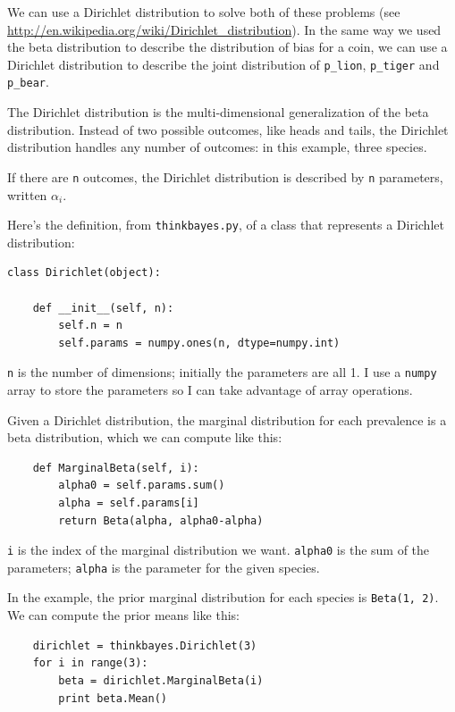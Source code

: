 \documentclass[12pt]{book}
\begin{document}
We can use a Dirichlet distribution to solve both of these problems
(see \url{http://en.wikipedia.org/wiki/Dirichlet_distribution}).  In
the same way we used the beta distribution to describe the
distribution of bias for a coin, we can use a Dirichlet
distribution to describe the joint distribution of \verb"p_lion",
\verb"p_tiger" and \verb"p_bear".

The Dirichlet distribution is the multi-dimensional generalization
of the beta distribution.  Instead of two possible outcomes, like
heads and tails, the Dirichlet distribution handles any number of
outcomes: in this example, three species.

If there are {\tt n} outcomes, the Dirichlet distribution is
described by {\tt n} parameters, written $\alpha_i$.

Here's the definition, from {\tt thinkbayes.py}, of a class that
represents a Dirichlet distribution:

\begin{verbatim}
class Dirichlet(object):

    def __init__(self, n):
        self.n = n
        self.params = numpy.ones(n, dtype=numpy.int)
\end{verbatim}

{\tt n} is the number of dimensions; initially the parameters
are all 1.  I use a {\tt numpy} array to store the parameters
so I can take advantage of array operations.

Given a Dirichlet distribution, the marginal distribution
for each prevalence is a beta distribution, which we can
compute like this:

\begin{verbatim}
    def MarginalBeta(self, i):
        alpha0 = self.params.sum()
        alpha = self.params[i]
        return Beta(alpha, alpha0-alpha)
\end{verbatim}

{\tt i} is the index of the marginal distribution we want.
{\tt alpha0} is the sum of the parameters; {\tt alpha} is the
parameter for the given species.

In the example, the prior marginal distribution for each species
is {\tt Beta(1, 2)}.  We can compute the prior means like
this:

\begin{verbatim}
    dirichlet = thinkbayes.Dirichlet(3)
    for i in range(3):
        beta = dirichlet.MarginalBeta(i)
        print beta.Mean()
\end{verbatim}
\end{document}
